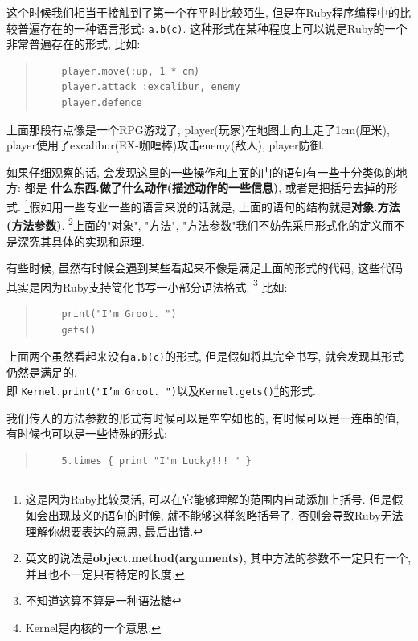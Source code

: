 这个时候我们相当于接触到了第一个在平时比较陌生, 但是在Ruby程序编程中的比较普遍存在的一种语言形式: \texttt{a.b(c)}. 这种形式在某种程度上可以说是Ruby的一个非常普遍存在的形式, 比如: 

\begin{quotation}
  \begin{verbatim}
    player.move(:up, 1 * cm)
    player.attack :excalibur, enemy
    player.defence
  \end{verbatim}
\end{quotation}

上面那段有点像是一个RPG游戏了, player(玩家)在地图上向上走了1cm(厘米), player使用了excalibur(EX-咖喱棒)攻击enemy(敌人), player防御. 

如果仔细观察的话, 会发现这里的一些操作和上面的门的语句有一些十分类似的地方: 都是 \textbf{什么东西.做了什么动作(描述动作的一些信息)}, 或者是把括号去掉的形式. \footnote{这是因为Ruby比较灵活, 可以在它能够理解的范围内自动添加上括号. 但是假如会出现歧义的语句的时候, 就不能够这样忽略括号了, 否则会导致Ruby无法理解你想要表达的意思, 最后出错. }假如用一些专业一些的语言来说的话就是, 上面的语句的结构就是\textbf{对象.方法(方法参数)}. \footnote{英文的说法是\textbf{object.method(arguments)}, 其中方法的参数不一定只有一个, 并且也不一定只有特定的长度. }上面的"对象", "方法", "方法参数"我们不妨先采用形式化的定义而不是深究其具体的实现和原理. %

有些时候, 虽然有时候会遇到某些看起来不像是满足上面的形式的代码, 这些代码其实是因为Ruby支持简化书写一小部分语法格式. \footnote{不知道这算不算是一种语法糖} 比如: 

\begin{quotation}
  \begin{verbatim}
    print("I'm Groot. ")
    gets()
  \end{verbatim}
\end{quotation}

上面两个虽然看起来没有\texttt{a.b(c)}的形式, 但是假如将其完全书写, 就会发现其形式仍然是满足的. \\即 \texttt{Kernel.print("I'm Groot. ")}以及\texttt{Kernel.gets()}\footnote{Kernel是内核的一个意思. }的形式. 

我们传入的方法参数的形式有时候可以是空空如也的, 有时候可以是一连串的值, 有时候也可以是一些特殊的形式: 

\begin{quotation}
  \begin{verbatim}
    5.times { print "I'm Lucky!!! " }
  \end{verbatim}
\end{quotation}

